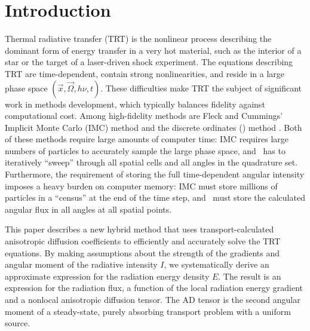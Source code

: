 \documentclass[11pt,letter,twoside]{mc2011}
\begin{document}
\section{Introduction}
Thermal radiative transfer (TRT) is the nonlinear process describing the
dominant form of energy transfer in a very hot material, such as the interior
of a star or the
target of a laser-driven shock experiment. The equations describing TRT are
time-dependent, contain strong nonlinearities, and reside in a large phase
space $(\vec{x}, \vec{\Omega}, h\nu, t)$.
These difficulties make TRT the subject of significant work in methods
development, which typically balances fidelity against computational cost. 
Among high-fidelity methods are Fleck and Cummings' Implicit Monte Carlo
(IMC) method \cite{Fle1971} and the discrete ordinates (\SN) method
\cite{Mor1996}. Both of these methods require large amounts of computer time:
IMC requires large numbers of particles to accurately sample the large phase
space, and \SN\ has to iteratively ``sweep'' through all spatial cells and all
angles in the quadrature set. Furthermore, the requirement of storing the full
time-dependent angular intensity imposes a heavy burden on computer memory: IMC
must store millions of particles in a ``census'' at the end of the time step,
and \SN\ must store the calculated angular flux in all angles at all spatial
points.

This paper describes a new hybrid method that uses transport-calculated
anisotropic diffusion coefficients to efficiently and accurately solve the TRT
equations. By making assumptions about the strength of the gradients and
angular moment of the radiative intensity $I$, we systematically derive an
approximate expression for the radiation energy density $E$. The result is an
expression for the radiation flux, a function of the local radiation energy
gradient and a nonlocal anisotropic diffusion tensor. The AD tensor is the
second angular moment of a steady-state, purely absorbing transport problem
with a uniform source.

\end{document}
